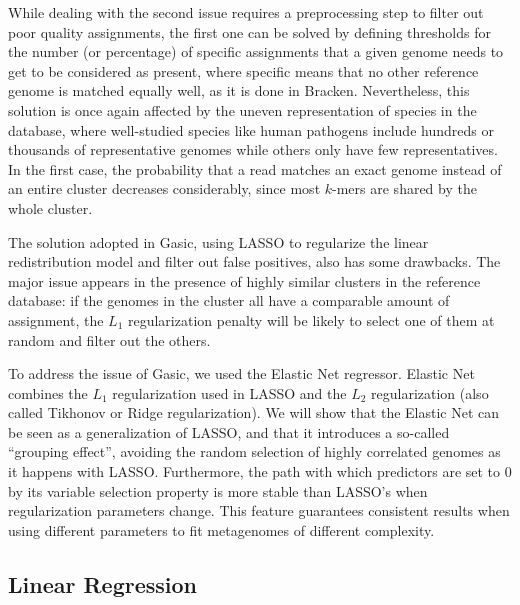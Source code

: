 While dealing with the second issue requires a preprocessing step to filter out poor quality assignments, the first one can be solved by defining thresholds for the number (or percentage) of specific assignments that a given genome needs to get to be considered as present, where specific means that no other reference genome is matched equally well, as it is done in Bracken. Nevertheless, this solution is once again affected by the uneven representation of species in the database, where well-studied species like human pathogens include hundreds or thousands of representative genomes while others only have few representatives. In the first case, the probability that a read matches an exact genome instead of an entire cluster decreases considerably, since most $k$-mers are shared by the whole cluster.

The solution adopted in Gasic, using LASSO to regularize the linear redistribution model and filter out false positives, also has some drawbacks. The major issue appears in the presence of highly similar clusters in the reference database: if the genomes in the cluster all have a comparable amount of assignment, the $L_1$ regularization penalty will be likely to select one of them at random and filter out the others.

To address the issue of Gasic, we used the Elastic Net regressor. Elastic Net combines the $L_1$ regularization used in LASSO and the $L_2$ regularization (also called Tikhonov or Ridge regularization). We will show that the Elastic Net can be seen as a generalization of LASSO, and that it introduces a so-called ``grouping effect'', avoiding the random selection of highly correlated genomes as it happens with LASSO. Furthermore, the path with which predictors are set to 0 by its variable selection property is more stable than LASSO's when regularization parameters change. This feature guarantees consistent results when using different parameters to fit metagenomes of different complexity.

\subsection{Linear Regression}

